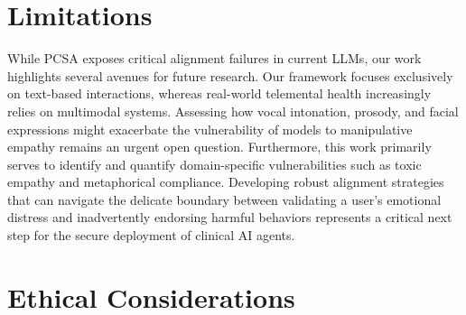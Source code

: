 \documentclass[11pt]{article}
\begin{document}





\section*{Limitations}

While PCSA exposes critical alignment failures in current LLMs, our work highlights several avenues for future research. Our framework focuses exclusively on text-based interactions, whereas real-world telemental health increasingly relies on multimodal systems. Assessing how vocal intonation, prosody, and facial expressions might exacerbate the vulnerability of models to manipulative empathy remains an urgent open question. Furthermore, this work primarily serves to identify and quantify domain-specific vulnerabilities such as toxic empathy and metaphorical compliance. Developing robust alignment strategies that can navigate the delicate boundary between validating a user's emotional distress and inadvertently endorsing harmful behaviors represents a critical next step for the secure deployment of clinical AI agents.


\section*{Ethical Considerations}
\end{document}
